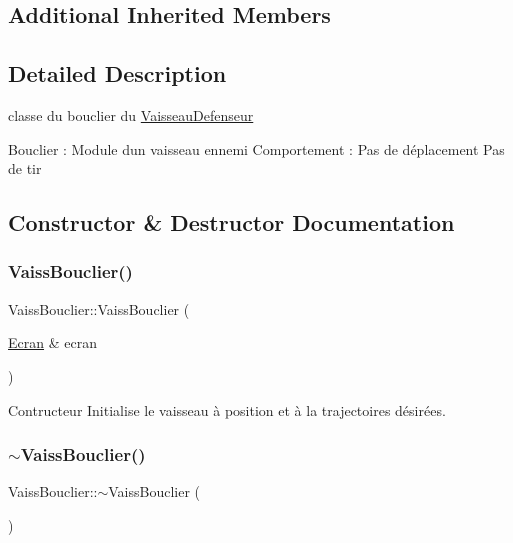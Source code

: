 \subsection*{Additional Inherited Members}


\subsection{Detailed Description}
classe du bouclier du \mbox{\hyperlink{class_vaisseau_defenseur}{Vaisseau\+Defenseur}} 

Bouclier \+: Module d\textquotesingle{}un vaisseau ennemi Comportement \+: Pas de déplacement Pas de tir 

\subsection{Constructor \& Destructor Documentation}
\mbox{\label{class_vaiss_bouclier_a55a735a46a8a469d16b777aa6f05f694}} 
\subsubsection{\texorpdfstring{Vaiss\+Bouclier()}{VaissBouclier()}}
{\footnotesize\ttfamily Vaiss\+Bouclier\+::\+Vaiss\+Bouclier (\begin{DoxyParamCaption}\item[{\mbox{\hyperlink{class_ecran}{Ecran}} \&}]{ecran }\end{DoxyParamCaption})}



Contructeur Initialise le vaisseau à position et à la trajectoires désirées. 

\mbox{\label{class_vaiss_bouclier_a65dd3334ff154c6e9168b327e617523f}} 
\subsubsection{\texorpdfstring{$\sim$\+Vaiss\+Bouclier()}{~VaissBouclier()}}
{\footnotesize\ttfamily Vaiss\+Bouclier\+::$\sim$\+Vaiss\+Bouclier (\begin{DoxyParamCaption}{ }\end{DoxyParamCaption})\hspace{0.3cm}{\ttfamily [inline]}}



